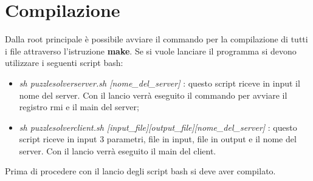 \documentclass[13pt]{article}
\begin{document}
\section{Compilazione}
Dalla root principale è possibile avviare il commando per la compilazione di tutti i file attraverso l'istruzione \textbf{make}. Se si vuole lanciare il programma si devono utilizzare i seguenti script bash:
\begin{itemize}
	\item \textit{sh puzzlesolverserver.sh [nome\_del\_server]} : questo script riceve in input il nome del server. Con il lancio verrà eseguito il commando per avviare il registro rmi e il main del server;
	\item \textit{sh puzzlesolverclient.sh [input\_file][output\_file][nome\_del\_server]} : questo script riceve in input 3 parametri, file in input, file in output e il nome del server. Con il lancio verrà eseguito il main del client. 
\end{itemize}
Prima di procedere con il lancio degli script bash si deve aver compilato.
\end{document}
